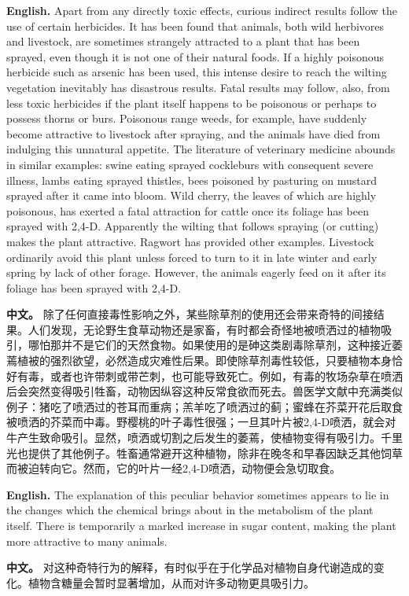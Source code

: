 \noindent\textbf{English.} Apart from any directly toxic effects, curious indirect results follow the use of certain herbicides. It has been found that animals, both wild herbivores and livestock, are sometimes strangely attracted to a plant that has been sprayed, even though it is not one of their natural foods. If a highly poisonous herbicide such as arsenic has been used, this intense desire to reach the wilting vegetation inevitably has disastrous results. Fatal results may follow, also, from less toxic herbicides if the plant itself happens to be poisonous or perhaps to possess thorns or burs. Poisonous range weeds, for example, have suddenly become attractive to livestock after spraying, and the animals have died from indulging this unnatural appetite. The literature of veterinary medicine abounds in similar examples: swine eating sprayed cockleburs with consequent severe illness, lambs eating sprayed thistles, bees poisoned by pasturing on mustard sprayed after it came into bloom. Wild cherry, the leaves of which are highly poisonous, has exerted a fatal attraction for cattle once its foliage has been sprayed with 2,4-D. Apparently the wilting that follows spraying (or cutting) makes the plant attractive. Ragwort has provided other examples. Livestock ordinarily avoid this plant unless forced to turn to it in late winter and early spring by lack of other forage. However, the animals eagerly feed on it after its foliage has been sprayed with 2,4-D.
\par
\noindent\textbf{中文。} 除了任何直接毒性影响之外，某些除草剂的使用还会带来奇特的间接结果。人们发现，无论野生食草动物还是家畜，有时都会奇怪地被喷洒过的植物吸引，哪怕那并不是它们的天然食物。如果使用的是砷这类剧毒除草剂，这种接近萎蔫植被的强烈欲望，必然造成灾难性后果。即使除草剂毒性较低，只要植物本身恰好有毒，或者也许带刺或带芒刺，也可能导致死亡。例如，有毒的牧场杂草在喷洒后会突然变得吸引牲畜，动物因纵容这种反常食欲而死去。兽医学文献中充满类似例子：猪吃了喷洒过的苍耳而重病；羔羊吃了喷洒过的蓟；蜜蜂在芥菜开花后取食被喷洒的芥菜而中毒。野樱桃的叶子毒性很强；一旦其叶片被2,4-D喷洒，就会对牛产生致命吸引。显然，喷洒或切割之后发生的萎蔫，使植物变得有吸引力。千里光也提供了其他例子。牲畜通常避开这种植物，除非在晚冬和早春因缺乏其他饲草而被迫转向它。然而，它的叶片一经2,4-D喷洒，动物便会急切取食。
\par\medskip

\noindent\textbf{English.} The explanation of this peculiar behavior sometimes appears to lie in the changes which the chemical brings about in the metabolism of the plant itself. There is temporarily a marked increase in sugar content, making the plant more attractive to many animals.
\par
\noindent\textbf{中文。} 对这种奇特行为的解释，有时似乎在于化学品对植物自身代谢造成的变化。植物含糖量会暂时显著增加，从而对许多动物更具吸引力。
\par\medskip

